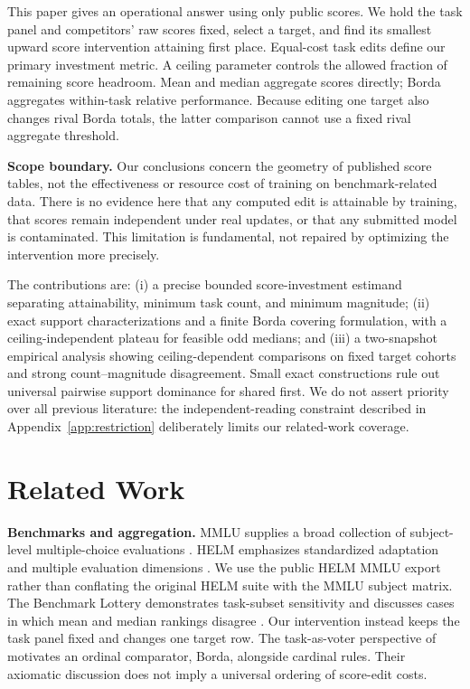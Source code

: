 \documentclass{article}
\begin{document}
This paper gives an operational answer using only public scores. We hold the task panel and competitors' raw scores fixed, select a target, and find its smallest upward score intervention attaining first place. Equal-cost task edits define our primary investment metric. A ceiling parameter controls the allowed fraction of remaining score headroom. Mean and median aggregate scores directly; Borda aggregates within-task relative performance. Because editing one target also changes rival Borda totals, the latter comparison cannot use a fixed rival aggregate threshold.

\textbf{Scope boundary.} Our conclusions concern the geometry of published score tables, not the effectiveness or resource cost of training on benchmark-related data. There is no evidence here that any computed edit is attainable by training, that scores remain independent under real updates, or that any submitted model is contaminated. This limitation is fundamental, not repaired by optimizing the intervention more precisely.

The contributions are: (i) a precise bounded score-investment estimand separating attainability, minimum task count, and minimum magnitude; (ii) exact support characterizations and a finite Borda covering formulation, with a ceiling-independent plateau for feasible odd medians; and (iii) a two-snapshot empirical analysis showing ceiling-dependent comparisons on fixed target cohorts and strong count--magnitude disagreement. Small exact constructions rule out universal pairwise support dominance for shared first. We do not assert priority over all previous literature: the independent-reading constraint described in Appendix~\ref{app:restriction} deliberately limits our related-work coverage.

\section{Related Work}
\textbf{Benchmarks and aggregation.} MMLU supplies a broad collection of subject-level multiple-choice evaluations \citep{hendrycks2021mmlu}. HELM emphasizes standardized adaptation and multiple evaluation dimensions \citep{liang2023helm}. We use the public HELM MMLU export rather than conflating the original HELM suite with the MMLU subject matrix. The Benchmark Lottery demonstrates task-subset sensitivity and discusses cases in which mean and median rankings disagree \citep{dehghani2021benchmarklottery}. Our intervention instead keeps the task panel fixed and changes one target row. The task-as-voter perspective of \citet{lanctot2023evaluating} motivates an ordinal comparator, Borda, alongside cardinal rules. Their axiomatic discussion does not imply a universal ordering of score-edit costs.
\end{document}
